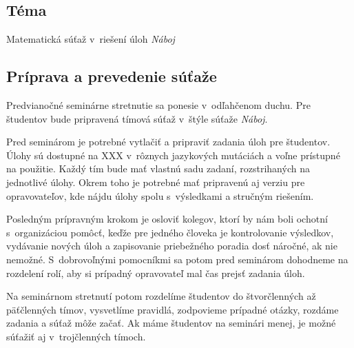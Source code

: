 

\subsection*{Téma}
Matematická súťaž v~riešení úloh \textit{Náboj}

\subsection*{Príprava a prevedenie súťaže}
Predvianočné seminárne stretnutie sa ponesie v~odľahčenom duchu. Pre študentov bude pripravená tímová súťaž v~štýle súťaže \textit{Náboj}.

Pred seminárom je potrebné vytlačiť a pripraviť zadania úloh pre študentov. Úlohy sú dostupné na XXX v~rôznych jazykových mutáciách a voľne prístupné na použitie. Každý tím bude mať vlastnú sadu zadaní, rozstrihaných na jednotlivé úlohy. Okrem toho je potrebné mať pripravenú aj verziu pre
opravovateľov, kde nájdu úlohy spolu s~výsledkami a stručným riešením.

Posledným prípravným krokom je osloviť kolegov, ktorí by nám boli ochotní s~organizáciou pomôcť, keďže pre jedného človeka je kontrolovanie výsledkov, vydávanie nových úloh a zapisovanie priebežného poradia dosť náročné, ak nie nemožné. S~dobrovoľnými pomocníkmi sa potom pred seminárom dohodneme na rozdelení rolí, aby si prípadný opravovateľ mal čas prejsť zadania úloh.

Na seminárnom stretnutí potom rozdelíme študentov do štvorčlenných až päťčlenných tímov, vysvetlíme pravidlá, zodpovieme prípadné otázky, rozdáme zadania a súťaž môže začať. Ak máme študentov na seminári menej, je možné súťažiť aj v~trojčlenných tímoch.
